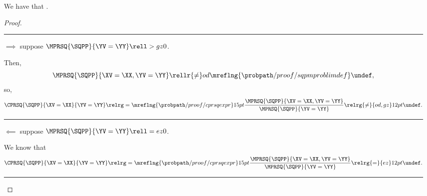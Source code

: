 \begin{proposition}
  We have that \sqcpproblimdefprop.%
\end{proposition}

\begin{proof}
  \hrule
  $\implies$ suppose $\MPRSQ{\SQPP}{\YV = \YY} \rell > gz 0$.

  Then,
  $$\MPRSQ{\SQPP}{\XV = \XX, \YV = \YY}
  \rellr {\ne} od {\mreflng{\probpath/proof/sqpmproblimdef}}
  \undef,$$
  so, 
  $$ \CPRSQ{\SQPP}{\XV = \XX}{\YV = \YY} 
  \relrg = {\mreflng{\probpath/proof/cprsqexpr}} 15pt
  \frac{\MPRSQ{\SQPP}{\XV = \XX, \YV = \YY}}{\MPRSQ{\SQPP}{\YV = \YY}}
  \relrg {\ne} {od,gz} 12pt \undef.$$
  \hrule
  $\impliedby$ suppose $\MPRSQ{\SQPP}{\YV = \YY} \rell = ez 0$.

  We know that
  $$ \CPRSQ{\SQPP}{\XV = \XX}{\YV = \YY} 
  \relrg = {\mreflng{\probpath/proof/cprsqexpr}} 15pt
  \frac{\MPRSQ{\SQPP}{\XV = \XX, \YV = \YY}}{\MPRSQ{\SQPP}{\YV = \YY}}
  \relrg {=} {ez} 12pt \undef.$$
  \hrule
\end{proof}
